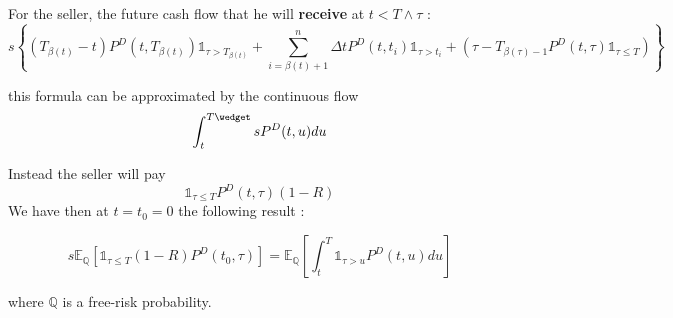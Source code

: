 For the seller, the future cash flow that he will \textbf{receive} at $t<T\wedge\tau$ :
\[
s\left\{(T_{\beta(t)}-t)P^D(t,T_{\beta(t)})\mathds{1}_{\tau>T_{\beta(t)}}+
\sum^n_{i=\beta(t)+1}\Delta                                                    t
P^D(t,t_i)\mathds{1}_{\tau>t_i}+(\tau-T_{\beta(\tau)-1}P^D(t,\tau)\mathds{1}_{\tau
  \leq
  T})\right\}
\]

this formula can be approximated by the continuous flow
\[
\int_t^{T\wedget}sP^D(t,u)du
\]

Instead the seller will pay 
\[
\mathds{1}_{\tau \leq T}P^D(t,\tau)(1-R)
\]
We have then at $t=t_0=0$ the following result :

\begin{equation}
  \label{eq:1}
s\mathbb{E}_{\mathbb{Q}}\left[\mathds{1}_{\tau \leq T}(1-R)P^D(t_0,\tau)\right]=
\mathbb{E}_\mathbb{Q}\left[\int_t^T\mathds{1}_{\tau>u}P^D(t,u)du\right]
  
\end{equation}


where $\mathbb{Q}$ is a free-risk probability.








